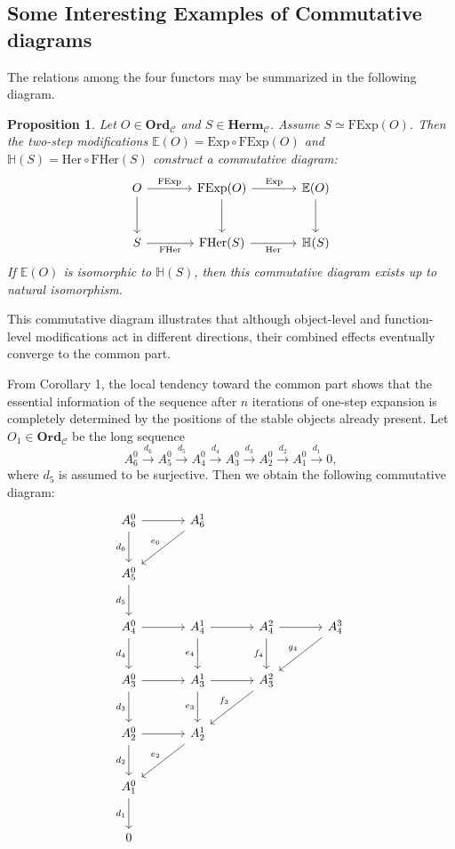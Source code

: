 \documentclass[11pt]{book}
\theoremstyle{definition}
\theoremstyle{plain}
\newtheorem{proposition}[theorem]{Proposition}
\theoremstyle{remark}
\begin{document}
\subsection{Some Interesting Examples of Commutative diagrams}

The relations among the four functors may be summarized 
in the following diagram. 

\begin{proposition}
Let $O\in\mathbf{Ord}_{\mathcal C}$ and $S\in\mathbf{Herm}_{\mathcal C}$. 
Assume $S\simeq \mathrm{FExp}(O)$. 
Then the two-step modifications 
$\mathbb{E}(O)=\mathrm{Exp}\circ\mathrm{FExp}(O)$ 
and $\mathbb{H}(S)=\mathrm{Her}\circ\mathrm{FHer}(S)$ 
construct a commutative diagram:
\[
\begin{tikzcd}[row sep=large, column sep=large]
O \ar[r, "\mathrm{FExp}"] \ar[d] & 
\mathrm{FExp}(O) \ar[r, "\mathrm{Exp}"] \ar[d] & 
\mathbb{E}(O) \ar[d] \\
S \ar[r, "\mathrm{FHer}"'] & 
\mathrm{FHer}(S) \ar[r, "\mathrm{Her}"'] & 
\mathbb{H}(S)
\end{tikzcd}
\]
If $\mathbb{E}(O)$ is isomorphic to $\mathbb{H}(S)$, then this commutative diagram exists up to natural isomorphism.
\end{proposition}

This commutative diagram illustrates that although object-level 
and function-level modifications act in different directions, 
their combined effects eventually converge to the common part.

From Corollary 1, the local tendency toward the common part shows that 
the essential information of the sequence after $n$ iterations of one-step expansion 
is completely determined by the positions of the stable objects already present.
Let $O_1 \in \mathbf{Ord}_\mathcal C$ be the long sequence
\[
A^0_6 \xrightarrow{d_6} A^0_5 \xrightarrow{d_5} A^0_4 \xrightarrow{d_4} A^0_3 
\xrightarrow{d_3} A^0_2 \xrightarrow{d_2} A^0_1 \xrightarrow{d_1} 0,
\]
where $d_5$ is assumed to be surjective. Then we obtain the following commutative diagram:
\[
\begin{tikzcd}[row sep=2.5em, column sep=3.5em]
A^0_6 \arrow[r]\arrow[d,"d_6"'] 
  & A^1_6 \arrow[dl,"e_6"']  
  & {} & {} \\
A^0_5 \arrow[d,"d_5"'] 
  & {} & {} & {} \\
A^0_4 \arrow[r]\arrow[d,"d_4"'] 
  & A^1_4 \arrow[r]\arrow[d,"e_4"']  
  & A^2_4 \arrow[r]\arrow[d,"f_4"']
  & A^3_4  \arrow[dl,"g_4"'] \\
A^0_3 \arrow[r]\arrow[d,"d_3"'] 
  & A^1_3 \arrow[r]\arrow[d,"e_3"'] 
  & A^2_3 \arrow[dl,"f_3"']
  & {} \\
A^0_2 \arrow[r]\arrow[d,"d_2"'] 
  & A^1_2 \arrow[dl,"e_2"'] 
  & {} & {} \\
A^0_1 \arrow[d,"d_1"'] 
  & {} & {} & {} \\
0 & {} & {} & {}
\end{tikzcd}
\]
\end{document}
